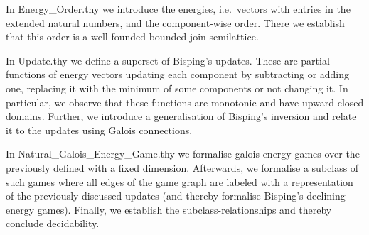 In Energy\_Order.thy we introduce the energies, i.e.\ vectors with entries in the extended natural numbers, and the component-wise order. There we establish that this order is a well-founded bounded join-semilattice. 

In Update.thy we define a superset of Bisping's updates. These are partial functions of energy vectors updating each component by subtracting or adding one, replacing it with the minimum of some components or not changing it. In particular, we observe that these functions are monotonic and have upward-closed domains.
Further, we introduce a generalisation of Bisping's inversion and relate it to the updates using Galois connections. 

In Natural\_Galois\_Energy\_Game.thy we formalise galois energy games over the previously defined with a fixed dimension. 
Afterwards, we formalise a subclass of such games where all edges of the game graph are labeled with a representation of the previously discussed updates (and thereby formalise Bisping's declining energy games).
Finally, we establish the subclass-relationships and thereby conclude decidability. 
